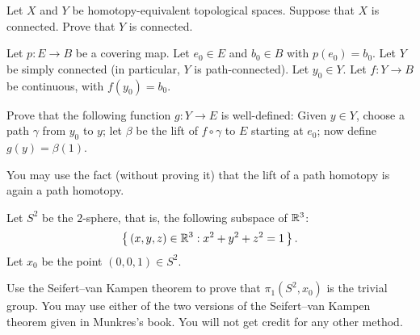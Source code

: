 \begin{problem}
  Let \(X\) and \(Y\) be homotopy-equivalent topological spaces. Suppose
  that \(X\) is connected. Prove that \(Y\) is connected.
\end{problem}
\begin{solution}
\end{solution}

\begin{problem}
  Let \(p\colon E\to B\) be a covering map. Let \(e_0\in E\) and
  \(b_0\in B\) with \(p(e_0)=b_0\). Let \(Y\) be simply connected (in
  particular, \(Y\) is path-connected). Let \(y_0\in Y\). Let
  \(f\colon Y\to B\) be continuous, with \(f(y_0)=b_0\).

  Prove that the following function \(g\colon Y\to E\) is well-defined:
  Given \(y\in Y\), choose a path \(\gamma\) from \(y_0\) to \(y\); let
  \(\beta\) be the lift of \(f\circ\gamma\) to \(E\) starting at \(e_0\);
  now define \(g(y)=\beta(1)\).

  You may use the fact (without proving it) that the lift of a path
  homotopy is again a path homotopy.
\end{problem}
\begin{solution}
\end{solution}

\begin{problem}
  Let \(S^2\) be the \(2\)-sphere, that is, the following subspace of
  \(\mathbb{R}^3\):
  \[
    \left\{\,(x,y,z)\in\mathbb{R}^3:x^2+y^2+z^2=1\,\right\}.
  \]
  Let \(x_0\) be the point \((0,0,1)\in S^2\).

  Use the Seifert--van Kampen theorem to prove that \(\pi_1(S^2,x_0)\) is
  the trivial group. You may use either of the two versions of the
  Seifert--van Kampen theorem given in Munkres's book. You will not get
  credit for any other method.
\end{problem}
\begin{solution}
\end{solution}

